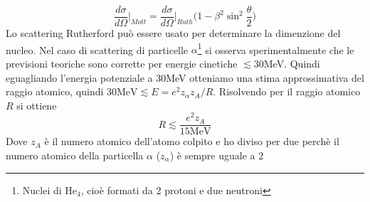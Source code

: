\documentclass[11pt,a4paper]{report}
\begin{document}
		\begin{equation}
			\frac{d\sigma}{d\Omega}\Big|_{Mott}=\frac{d\sigma}{d\Omega}\Big|_{Ruth}\Big(1-\beta ^2\sin ^2\frac\theta 2\Big)
		\end{equation}
		Lo scattering Rutherford può essere usato per determinare la dimenzione del nucleo.\newline
		Nel caso di scattering di particelle $\alpha$\footnote{Nuclei di He$_4$, cioè formati da 2 protoni e due neutroni} si osserva sperimentalmente che le previsioni teoriche sono corrette per energie cinetiche  $\lesssim 30$MeV. Quindi eguagliando l'energia potenziale a $30$MeV otteniamo una stima approssimativa del raggio atomico, quindi $30 \textrm{MeV}\lesssim E=e^2z_\alpha z_A/R$. Risolvendo per il raggio atomico $R$ si ottiene
		\begin{equation}
			R\lesssim\frac{e^2z_A}{15 \textrm{MeV}}
		\end{equation}
		Dove $z_A$ è il numero atomico dell'atomo colpito e ho diviso per due perchè il numero atomico della particella $\alpha$ ($z_\alpha$) è sempre uguale a $2$
\end{document}
